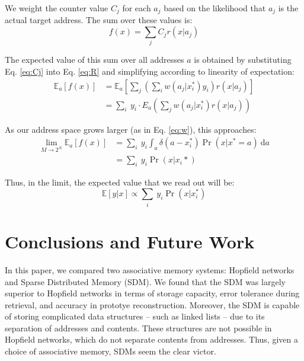 \documentclass[10pt,letterpaper]{article}
\begin{document}
\noindent We weight the counter value $C_j$ for each $a_j$ based on the
likelihood that $a_j$ is the actual target address. The sum over these
values is:
\begin{equation}
f(x)=\sum_j C_j r(x| a_j)
\label{eq:R}
\end{equation}


\noindent The expected value of this sum over all addresses $a$ is obtained by
substituting Eq. \ref{eq:Cj} into Eq. \ref{eq:R} and simplifying according
to linearity of expectation:
\begin{align}
\mathbb{E}_a[f(x)]&=\mathbb{E}_a\left[\sum_j\left(\sum_i w(a_j| x_i^*)y_i\right)r(x|a_j)\right]\\
&=\sum_i\ y_i\cdot E_a\left(\sum_j w(a_j| x_i^*)r(x|a_j)\right)
\end{align}

\noindent As our address space grows larger (as in Eq. \ref{eq:w}), this approaches:
\begin{align}
\lim_{M\rightarrow 2^N} \mathbb{E}_a[f(x)]&=\sum_i\ y_i \int_a \delta(a-x_i^*)\Pr(x|x^*=a)\ \mathrm{d}a\\
&= \sum_i\ y_i\Pr(x|x_i*)
\end{align}

\noindent Thus, in the limit, the expected value that we read out will be:
\begin{equation}
\mathbb{E}[y|x]\propto \sum_i\ y_i\Pr(x|x_i^*)
\end{equation}



\section{Conclusions and Future Work}

In this paper, we compared two associative memory systems: Hopfield
networks and Sparse Distributed Memory (SDM). We found that the SDM
was largely superior to Hopfield networks in terms of storage
capacity, error tolerance during retrieval, and accuracy in prototye
reconstruction. Moreover, the SDM is capable of storing complicated
data structures -- such as linked lists -- due to its separation of
addresses and contents.  These structures are not possible in Hopfield
networks, which do not separate contents from addresses. Thus, given a
choice of associative memory, SDMs seem the clear victor.
\end{document}

